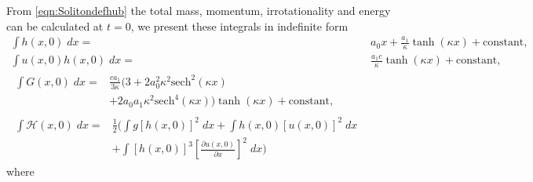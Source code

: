 From \eqref{eqn:Solitondefhub} the total mass, momentum, irrotationality and energy can be calculated at $t=0$, we present these integrals in indefinite form
\begin{subequations}
\begin{align}
\int h(x,0) \; dx = {} & a_0 x + \frac{a_1}{\kappa} \tanh\left(\kappa x\right) + \text{constant}, \\
\int u(x,0)h(x,0) \;  dx = {} & \frac{a_1 c}{\kappa} \tanh\left(\kappa x\right)+ \text{constant}, \\
\begin{split}
\int G(x,0) \; dx = {}&  \frac{c a_1}{3 \kappa}  \Bigg(3 + 2a_0^2 \kappa^2\text{sech}^2\left(\kappa x\right)  \\ &+ 2a_0 a_1 \kappa^2 \text{sech}^4\left(\kappa x\right) \Bigg)\tanh\left(\kappa x\right)  + \text{constant} ,
\end{split}
\\
\begin{split}
\int \mathcal{H}(x,0) \; dx = {}&\frac{1}{2} \Bigg(\int g\left[h(x,0)\right]^2 \; dx + \int h(x,0)\left[u(x,0)\right]^2 \; dx  \\ &+ \int \left[h(x,0)\right]^3 \left[\frac{\partial u(x,0)}{\partial x}\right]^2 \; dx \Bigg) 
\end{split}
\end{align}
\label{eqn:SolitonConservation}
\end{subequations}
where
